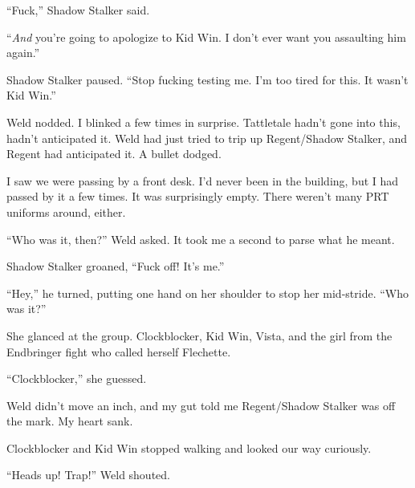 ``Fuck,'' Shadow Stalker said.



``\emph{And} you're going to apologize to Kid Win.  I don't ever want you assaulting him again.''



Shadow Stalker paused.  ``Stop fucking testing me.  I'm too tired for this.  It wasn't Kid Win.''



Weld nodded.  I blinked a few times in surprise.  Tattletale hadn't gone into this, hadn't anticipated it. Weld had just tried to trip up Regent/Shadow Stalker, and Regent had anticipated it.  A bullet dodged.



I saw we were passing by a front desk.  I'd never been in the building, but I had passed by it a few times.  It was surprisingly empty.  There weren't many PRT uniforms around, either.



``Who was it, then?'' Weld asked.  It took me a second to parse what he meant.



Shadow Stalker groaned, ``Fuck off!  It's me.''



``Hey,'' he turned, putting one hand on her shoulder to stop her mid-stride.  ``Who was it?''



She glanced at the group.  Clockblocker, Kid Win, Vista, and the girl from the Endbringer fight who called herself Flechette.



``Clockblocker,'' she guessed.



Weld didn't move an inch, and my gut told me Regent/Shadow Stalker was off the mark.  My heart sank.



Clockblocker and Kid Win stopped walking and looked our way curiously.



``Heads up!  Trap!'' Weld shouted.





